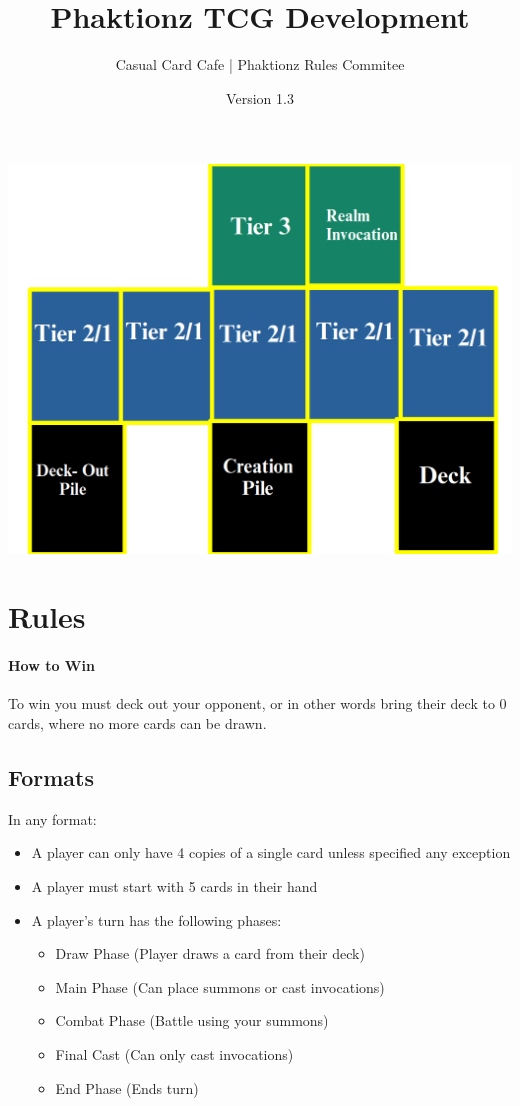 \documentclass[12pt, letterpaper]{article}
\title{Phaktionz TCG Development}
\author{Casual Card Cafe | Phaktionz Rules Commitee}
\date{Version 1.3}
\begin{document}
\maketitle
{}
\newpage
\tableofcontents
\newpage
\begin{center}
    \includegraphics[scale = 0.25]{images/field.png}
\end{center}


\section{Rules}
\paragraph{How to Win\\}
To win you must deck out your opponent, or in other words bring their deck to 0 cards, where no more cards can be drawn.
\subsection{Formats}
In any format: 
\begin{itemize}
    \item A player can only have 4 copies of a single card unless specified any exception
    \item A player must start with 5 cards in their hand 
    \item A player's turn has the following phases:
     \begin{itemize}
        \item Draw Phase (Player draws a card from their deck)
        \item Main Phase (Can place summons or cast invocations)
        \item Combat Phase (Battle using your summons)
        \item Final Cast (Can only cast invocations)
        \item End Phase (Ends turn)
     \end{itemize}
\end{itemize}
\end{document}
